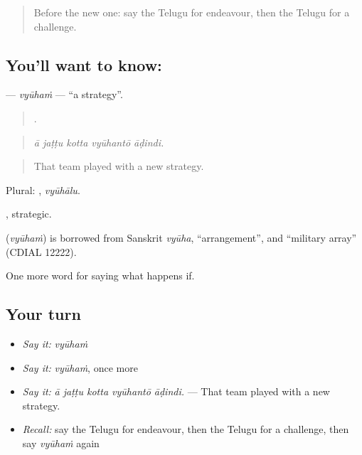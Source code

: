 \label{lesson:TE-C433-vyuham}



\begin{quote}
Before the new one: say the Telugu for endeavour, then the Telugu for a challenge.
\end{quote}

\subsection*{You'll want to know: }
\textbf{} — \emph{vyūhaṁ} — \textquotedblleft{}a strategy\textquotedblright{}.

\begin{quote}
    .
\end{quote}

\begin{quote}
\emph{ā jaṭṭu kotta vyūhantō āḍindi.}
\end{quote}

\begin{quote}
That team played with a new strategy.
\end{quote}

Plural: , \emph{vyūhālu}.

, strategic.

\begin{cousinweb}
\textbf{} (\emph{vyūhaṁ}) is borrowed from Sanskrit \emph{vyūha}, \textquotedblleft{}arrangement\textquotedblright{}, and \textquotedblleft{}military array\textquotedblright{} (CDIAL 12222).
\end{cousinweb}

\begin{grammarlens}[title={What you've built}]
One more word for saying what happens if.
\end{grammarlens}

\subsection*{Your turn}
\begin{itemize}
\raggedright
  \item \emph{Say it:} \emph{vyūhaṁ}
  \item \emph{Say it:} \emph{vyūhaṁ}, once more
  \item \emph{Say it:} \emph{ā jaṭṭu kotta vyūhantō āḍindi.} — That team played with a new strategy.
  \item \emph{Recall:} say the Telugu for endeavour, then the Telugu for a challenge, then say \emph{vyūhaṁ} again
\end{itemize}

